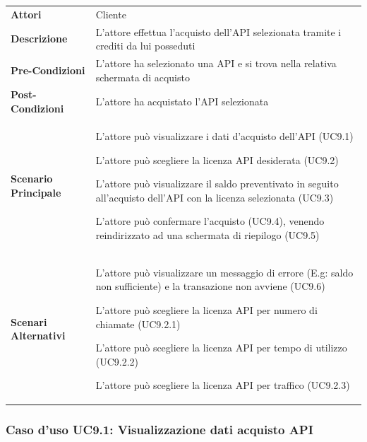 \begin{longtable}{ l | p{11cm}}
	\hline
	\rowcolor{Gray}
	\multicolumn{2}{c}{UC9 - Acquisto API}\\
	\hline
	\textbf{Attori} & Cliente \\
	\textbf{Descrizione} & L'attore effettua l'acquisto dell'API selezionata tramite i crediti da lui posseduti \\
	\textbf{Pre-Condizioni} & L'attore ha selezionato una API e si trova nella relativa schermata di acquisto \\
	\textbf{Post-Condizioni} & L'attore ha acquistato l'API selezionata \\
	\textbf{Scenario Principale} & 
	\begin{enumerate*}[label=(\arabic*.),itemjoin={\newline}]
		\item L'attore può visualizzare i dati d'acquisto dell'API (UC9.1)
		\item L'attore può scegliere la licenza API desiderata (UC9.2)
		\item L'attore può visualizzare il saldo preventivato in seguito all'acquisto dell'API con la licenza selezionata (UC9.3)
		\item L'attore può confermare l'acquisto (UC9.4), venendo reindirizzato ad una schermata di riepilogo (UC9.5)
	\end{enumerate*}\\
	\textbf{Scenari Alternativi} & 
	\begin{enumerate*}[label=(\arabic*.),itemjoin={\newline}]
		\item L'attore può visualizzare un messaggio di errore (E.g: saldo non sufficiente) e la transazione non avviene (UC9.6)
		\item L'attore può scegliere la licenza API per numero di chiamate (UC9.2.1)
		\item L'attore può scegliere la licenza API per tempo di utilizzo (UC9.2.2)
		\item L'attore può scegliere la licenza API per traffico (UC9.2.3)
	\end{enumerate*}\\
\end{longtable}

\subsubsection{Caso d'uso UC9.1: Visualizzazione dati acquisto API}
\label{UC9_1}

